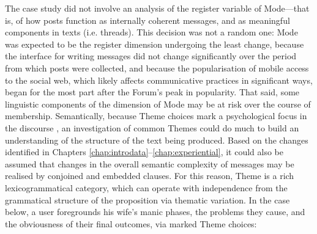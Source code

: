 The case study did not involve an analysis of the register variable of Mode---that is, of how \glspl{post} function as internally coherent messages, and as meaningful components in texts (i.e. \glspl{thread}). This decision was not a random one: Mode was expected to be the register dimension undergoing the least change, because the interface for writing messages did not change significantly over the period from which \glspl{post} were collected, and because the popularisation of mobile access to the social web, which likely affects communicative practices in significant ways, began for the most part after the \gls{Forum}'s peak in popularity. That said, some linguistic components of the dimension of Mode may be at risk over the course of membership. Semantically, because Theme choices mark a psychological focus in the discourse \cite{halliday_introduction_2004}, an investigation of common Themes could do much to build an understanding of the structure of the text being produced. Based on the changes identified in Chapters \ref{chap:introdata}--\ref{chap:experiential}, it could also be assumed that changes in the overall semantic complexity of messages may be realised by conjoined and embedded clauses. For this reason, \gls{Theme} is a rich lexicogrammatical category, which can operate with independence from the grammatical structure of the proposition via thematic variation. In the case below, a user foregrounds his wife's manic phases, the problems they cause, and the obviousness of their final outcomes, via marked \gls{Theme} choices:

